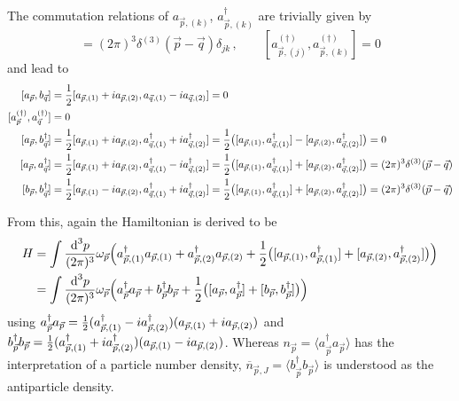 The commutation relations of $a_{\vec{p},(k)}$, $a_{\vec{p},(k)}^\dagger$ are trivially given by
\begin{equation}
    [a_{\vec{p},(j)},a_{\vec{q},(k)}^\dagger]=(2\pi)^3\delta^{(3)}(\vec{p}-\vec{q})\delta_{jk}\,,\qquad[a_{\vec{p},(j)}^{(\dagger)},a_{\vec{p},(k)}^{(\dagger)}]=0
\end{equation}
and lead to
\begin{subequations}
    \begin{align}
        [a_{\vec{p}},b_{\vec{q}}]&=\frac{1}{2}[a_{\vec{p},(1)}+{i} a_{\vec{p},(2)},a_{\vec{q},(1)}-{i} a_{\vec{q},(2)}]=0\\
        [a_{\vec{p}}^{(\dagger)},a_{\vec{q}}^{(\dagger)}]&=0\\
        [a_{\vec{p}},b_{\vec{q}}^\dagger]&=\frac{1}{2}[a_{\vec{p},(1)}+{i} a_{\vec{p},(2)},a_{\vec{q},(1)}^\dagger+{i} a_{\vec{q},(2)}^\dagger]=\frac{1}{2}\big([a_{\vec{p},(1)},a_{\vec{q},(1)}^\dagger]-[a_{\vec{p},(2)},a_{\vec{q},(2)}^\dagger]\big)=0\\
        [a_{\vec{p}},a_{\vec{q}}^\dagger]&=\frac{1}{2}[a_{\vec{p},(1)}+{i} a_{\vec{p},(2)},a_{\vec{q},(1)}^\dagger-{i} a_{\vec{q},(2)}^\dagger]=\frac{1}{2}\big([a_{\vec{p},(1)},a_{\vec{q},(1)}^\dagger]+[a_{\vec{p},(2)},a_{\vec{q},(2)}^\dagger]\big)=(2\pi)^3\delta^{(3)}(\vec{p}-\vec{q})\\
        [b_{\vec{p}},b_{\vec{q}}^\dagger]&=\frac{1}{2}[a_{\vec{p},(1)}-{i} a_{\vec{p},(2)},a_{\vec{q},(1)}^\dagger+{i} a_{\vec{q},(2)}^\dagger]=\frac{1}{2}\big([a_{\vec{p},(1)},a_{\vec{q},(1)}^\dagger]+[a_{\vec{p},(2)},a_{\vec{q},(2)}^\dagger]\big)=(2\pi)^3\delta^{(3)}(\vec{p}-\vec{q})
    \end{align}
\end{subequations}

From this, again the Hamiltonian is derived to be
\begin{subequations}
    \begin{align}        
        H&=\int\frac{\text{d}^3p}{(2\pi)^3}\omega_{\vec{p}}\Big(a_{\vec{p},(1)}^\dagger a_{\vec{p},(1)}+a_{\vec{p},(2)}^\dagger a_{\vec{p},(2)}+\frac{1}{2}\big([a_{\vec{p},(1)},a_{\vec{p},(1)}^\dagger]+[a_{\vec{p},(2)},a_{\vec{p},(2)}^\dagger]\big)\Big)\\
        &=\int\frac{\text{d}^3p}{(2\pi)^3}\omega_{\vec{p}}\Big(a_{\vec{p}}^\dagger a_{\vec{p}}+b_{\vec{p}}^\dagger b_{\vec{p}}+\frac{1}{2}\big([a_{\vec{p}},a_{\vec{p}}^\dagger]+[b_{\vec{p}},b_{\vec{p}}^\dagger]\big)\Big)
    \end{align}
\end{subequations}
using $a_{\vec{p}}^\dagger a_{\vec{p}}=\frac{1}{2}(a_{\vec{p},(1)}^\dagger-{i} a_{\vec{p},(2)}^\dagger)(a_{\vec{p},(1)}+{i} a_{\vec{p},(2)})$ and $b_{\vec{p}}^\dagger b_{\vec{p}}=\frac{1}{2}(a_{\vec{p},(1)}^\dagger+{i} a_{\vec{p},(2)}^\dagger)(a_{\vec{p},(1)}-{i} a_{\vec{p},(2)})$. Whereas $n_{\vec{p}}=\langle a_{\vec{p}}^\dagger a_{\vec{p}}\rangle$ has the interpretation of a particle number density, $\overline{n}_{\vec{p},J}=\langle b_{\vec{p}}^\dagger b_{\vec{p}}\rangle$ is understood as the antiparticle density.

